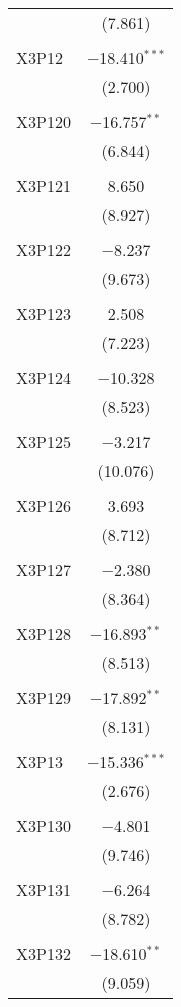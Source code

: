 \begin{table}[!htbp]
\begin{tabular}{@{\extracolsep{5pt}}lc}
  & (7.861) \\ 
  & \\ 
 X3P12 & $-$18.410$^{***}$ \\ 
  & (2.700) \\ 
  & \\ 
 X3P120 & $-$16.757$^{**}$ \\ 
  & (6.844) \\ 
  & \\ 
 X3P121 & 8.650 \\ 
  & (8.927) \\ 
  & \\ 
 X3P122 & $-$8.237 \\ 
  & (9.673) \\ 
  & \\ 
 X3P123 & 2.508 \\ 
  & (7.223) \\ 
  & \\ 
 X3P124 & $-$10.328 \\ 
  & (8.523) \\ 
  & \\ 
 X3P125 & $-$3.217 \\ 
  & (10.076) \\ 
  & \\ 
 X3P126 & 3.693 \\ 
  & (8.712) \\ 
  & \\ 
 X3P127 & $-$2.380 \\ 
  & (8.364) \\ 
  & \\ 
 X3P128 & $-$16.893$^{**}$ \\ 
  & (8.513) \\ 
  & \\ 
 X3P129 & $-$17.892$^{**}$ \\ 
  & (8.131) \\ 
  & \\ 
 X3P13 & $-$15.336$^{***}$ \\ 
  & (2.676) \\ 
  & \\ 
 X3P130 & $-$4.801 \\ 
  & (9.746) \\ 
  & \\ 
 X3P131 & $-$6.264 \\ 
  & (8.782) \\ 
  & \\ 
 X3P132 & $-$18.610$^{**}$ \\ 
  & (9.059) \\ 

\end{tabular}
\end{table}
